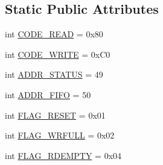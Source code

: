 \subsection*{Static Public Attributes}
\begin{DoxyCompactItemize}
\item 
int \hyperlink{classsoftware_1_1chipwhisperer_1_1capture_1_1targets_1_1SAKURAG_1_1ChipWhispererComm_ad2ccac46a58b65bfb9a373ff798d23bd}{C\+O\+D\+E\+\_\+\+R\+E\+A\+D} = 0x80
\item 
int \hyperlink{classsoftware_1_1chipwhisperer_1_1capture_1_1targets_1_1SAKURAG_1_1ChipWhispererComm_a1e107c656728a8cc0f3ceaa461c9e852}{C\+O\+D\+E\+\_\+\+W\+R\+I\+T\+E} = 0x\+C0
\item 
int \hyperlink{classsoftware_1_1chipwhisperer_1_1capture_1_1targets_1_1SAKURAG_1_1ChipWhispererComm_ab32929b54d31f5e1ceae0c8c23df1a45}{A\+D\+D\+R\+\_\+\+S\+T\+A\+T\+U\+S} = 49
\item 
int \hyperlink{classsoftware_1_1chipwhisperer_1_1capture_1_1targets_1_1SAKURAG_1_1ChipWhispererComm_a2d8e1e80332b73a79cacc8d693c6fc9c}{A\+D\+D\+R\+\_\+\+F\+I\+F\+O} = 50
\item 
int \hyperlink{classsoftware_1_1chipwhisperer_1_1capture_1_1targets_1_1SAKURAG_1_1ChipWhispererComm_ac677a497db9caf3b306164e16cf34a2d}{F\+L\+A\+G\+\_\+\+R\+E\+S\+E\+T} = 0x01
\item 
int \hyperlink{classsoftware_1_1chipwhisperer_1_1capture_1_1targets_1_1SAKURAG_1_1ChipWhispererComm_af41117429de7bf24fa1a953afb072e46}{F\+L\+A\+G\+\_\+\+W\+R\+F\+U\+L\+L} = 0x02
\item 
int \hyperlink{classsoftware_1_1chipwhisperer_1_1capture_1_1targets_1_1SAKURAG_1_1ChipWhispererComm_af3f1fa7ab94831dff83830566879e9b1}{F\+L\+A\+G\+\_\+\+R\+D\+E\+M\+P\+T\+Y} = 0x04
\end{DoxyCompactItemize}


